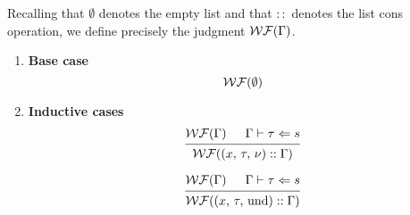 \documentclass{article}
\begin{document}
\begin{definition} 
  Recalling that $\emptyset$ denotes the empty list and that $::$ denotes the list
  cons operation, we define precisely the judgment $\operatorname{\mathcal{WF}}(\Gamma)$.

  \begin{enumerate}
  \item \textbf{Base case} \\
    \[
      \begin{prooftree}
        \hypo{\wf(\emptyset)}
      \end{prooftree}
    \]

  \item \textbf{Inductive cases} \\
    \[
      \begin{prooftree}
        \hypo{\wf(\Gamma)}
        \hypo{\Gamma \vdash \tau \Leftarrow s}
        \infer2{\wf ((x, \, \tau, \, \nu) :: \Gamma)}
      \end{prooftree}
    \]

    \[
      \begin{prooftree}
        \hypo{\wf(\Gamma)}
        \hypo{\Gamma \vdash \tau \Leftarrow s}
        \infer2{\wf ((x, \, \tau, \, \text{und}) :: \Gamma)}
      \end{prooftree}
    \]
  \end{enumerate}
\end{definition}
\end{document}
